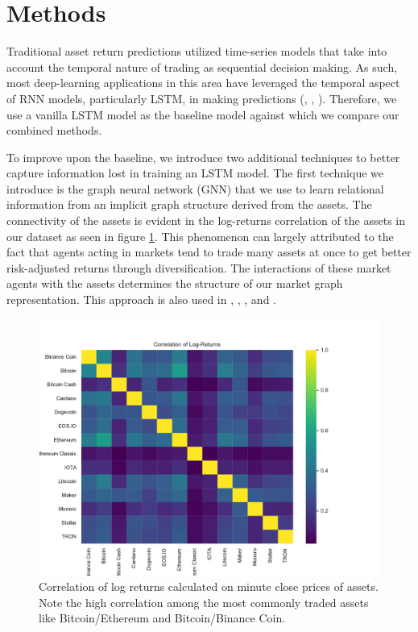 \section{Methods}

Traditional asset return predictions utilized time-series models that take into account the temporal nature of trading as sequential decision making. As such, most deep-learning applications in this area have leveraged the temporal aspect of RNN models, particularly LSTM, in making predictions (\cite{Shen2020}, \cite{Li2018}, \cite{Selvin2017}). Therefore, we use a vanilla LSTM model as the baseline model against which we compare our combined methods.

To improve upon the baseline, we introduce two additional techniques to better capture information lost in training an LSTM model. The first technique we introduce is the graph neural network (GNN) that we use to learn relational information from an implicit graph structure derived from the assets. The connectivity of the assets is evident in the log-returns correlation of the assets in our dataset as seen in figure \ref{fig:asset_corr}. This phenomenon can largely attributed to the fact that agents acting in markets tend to trade many assets at once to get better risk-adjusted returns through diversification. The interactions of these market agents with the assets determines the structure of our market graph representation. This approach is also used in \cite{Matsunaga2019}, \cite{Sun2020}, \cite{Feng2019}, and \cite{Peng2021}.

\begin{figure}[H]
	\centering
	\includegraphics[width=\linewidth]{../../figures/correlation.pdf}
	\caption{Correlation of log returns calculated on minute close prices of assets. Note the high correlation among the most commonly traded assets like Bitcoin/Ethereum and Bitcoin/Binance Coin.}
	\label{fig:asset_corr}
\end{figure}

